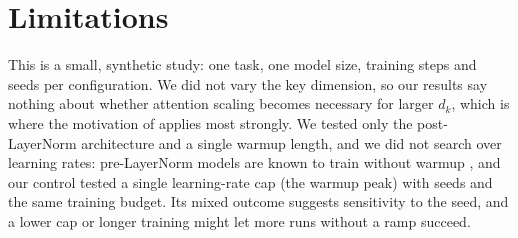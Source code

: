 \section{Limitations}
\label{sec:limitations}

This is a small, synthetic study: one task, one model size, \valSteps{} training steps and \valSeeds{} seeds per
configuration. We did not vary the key dimension, so our results say nothing about whether attention scaling
becomes necessary for larger $d_k$, which is where the motivation of \citet{vaswani2017attention} applies most
strongly. We tested only the post-LayerNorm architecture and a single warmup length, and we did not search over
learning rates: pre-LayerNorm models are known to train without warmup \citep{xiong2020layer}, and our control tested a single
learning-rate cap (the warmup peak) with \valSeeds{} seeds and the same training budget. Its mixed outcome suggests
sensitivity to the seed, and a lower cap or longer training might let more runs without a ramp succeed.
